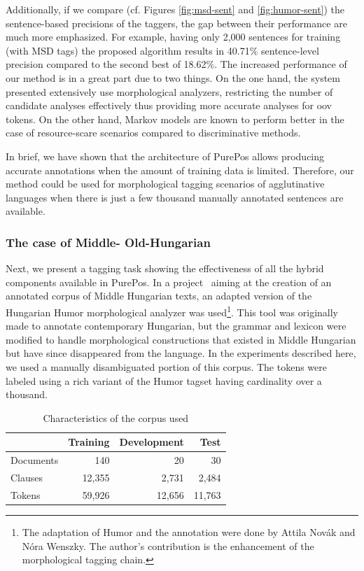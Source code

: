 Additionally, if we compare (cf. Figures \ref{fig:msd-sent} and \ref{fig:humor-sent}) the sentence-based precisions of the taggers, the gap between their performance are much more emphasized. 
For example, having only 2,000 sentences for training (with MSD tags) the proposed algorithm results in 40.71\% sentence-level precision compared to the second best of 18.62\%.
The increased performance of our method is in a great part due to two things. 
On the one hand, the system presented extensively use  morphological analyzers, restricting the number of candidate analyses effectively thus providing more accurate analyses for \acrshort{oov} tokens.
On the other hand, Markov models are known to perform better in the case of resource-scare scenarios compared to discriminative methods.

In brief, we have shown that the architecture of PurePos allows producing accurate annotations when the amount of training data is limited. Therefore, our method could be used for morphological tagging scenarios of agglutinative languages when there is just a few thousand manually annotated sentences are available.

\subsubsection{The case of Middle- Old-Hungarian}
\label{sec:oldhungarian}

Next, we present a tagging task showing the effectiveness of all the hybrid components available in PurePos. 
In a project~\cite{NovakOMK,Novak2013} aiming at the creation of an annotated corpus of Middle Hungarian texts, an adapted version of the Hungarian Humor morphological analyzer \cite{NovakOMK} was used\footnote{The adaptation of Humor and the annotation were done by  Attila Novák and Nóra Wenszky. The author's contribution is the enhancement of the morphological tagging chain.}. 
This tool was originally made to annotate contemporary Hungarian, but the grammar and lexicon were modified to handle morphological constructions that existed in Middle Hungarian but have since disappeared from the language. 
In the experiments described here, we used a manually disambiguated portion of this corpus. The tokens were labeled using a rich variant of the Humor tagset having cardinality over a thousand.

\begin{table}[H]
\centering
\caption{Characteristics of the corpus used}\label{tab:oldhun-corpus}
\begin{tabular}{l r r r}
\hline
& Training & Development & Test \\
\hline
Documents & 140 & 20 & 30 \\
Clauses & 12,355 & 2,731 & 2,484 \\
Tokens & 59,926 & 12,656 &  11,763\\
\hline
\end{tabular}
\end{table}

